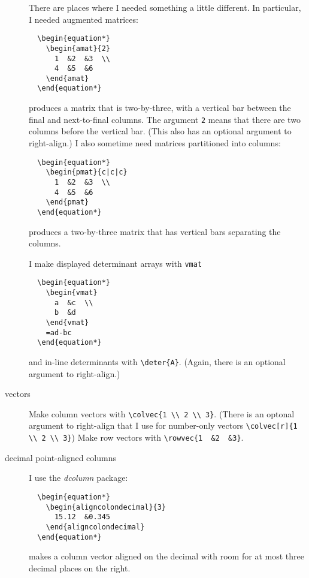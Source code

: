 \documentclass[titlepage]{article}
\begin{document}
\begin{description}
  There are places where I needed something a little different.
  In particular, I needed augmented matrices:
\begin{verbatim}
  \begin{equation*}
    \begin{amat}{2}
      1  &2  &3  \\
      4  &5  &6 
    \end{amat}
  \end{equation*}
\end{verbatim}
  produces a matrix that is two-by-three, with a vertical bar between
  the final and next-to-final columns. 
  The argument \texttt{2} means that there
  are two columns before the vertical bar.
  (This also has an optional argument to right-align.)
  I also sometime need matrices partitioned into columns:
\begin{verbatim}
  \begin{equation*}
    \begin{pmat}{c|c|c}
      1  &2  &3  \\
      4  &5  &6 
    \end{pmat}
  \end{equation*}
\end{verbatim}
  produces a two-by-three matrix that has vertical bars separating the
  columns.

  I make displayed determinant arrays with \verb!vmat! 
\begin{verbatim}
  \begin{equation*}
    \begin{vmat}
      a  &c  \\
      b  &d   
    \end{vmat}
    =ad-bc
  \end{equation*}
\end{verbatim}
  and in-line  determinants with \verb!\deter{A}!.
  (Again, there is an optional argument to right-align.)

\item[vectors]
  Make column vectors with \verb|\colvec{1 \\ 2 \\ 3}|.
  (There is an optonal argument to right-align that I use 
  for number-only vectors \verb|\colvec[r]{1 \\ 2 \\ 3}|)
  Make row vectors with \verb|\rowvec{1  &2  &3}|.

\item[decimal point-aligned columns]
  I use the \textit{dcolumn} package:
\begin{verbatim}
  \begin{equation*}
    \begin{aligncolondecimal}{3}
      15.12  &0.345    
    \end{aligncolondecimal}
  \end{equation*}
\end{verbatim}
  makes a column vector aligned on the decimal with room for at most 
  three decimal places on the right.



\end{description}
\end{document}
